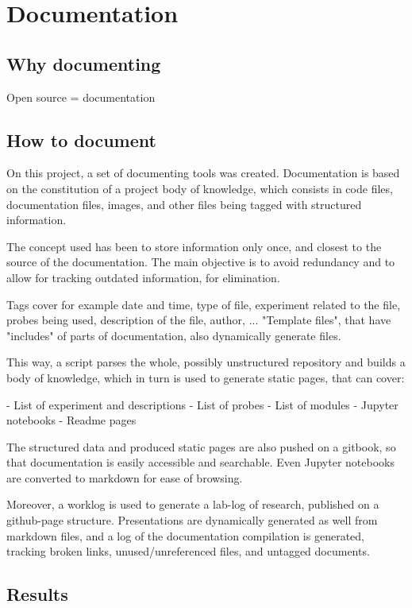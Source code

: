 \documentclass[conference]{IEEEtran}
\begin{document}
\section{Documentation}

\subsection{Why documenting}

Open source = documentation

\subsection{How to document}

On this project, a set of documenting tools was created. Documentation is based on the constitution of a project body of knowledge, which consists in code files, documentation files, images, and other files being tagged with structured information.

The concept used has been to store information only once, and closest to the source of the documentation. The main objective is to avoid redundancy and to allow for tracking outdated information, for elimination.

Tags cover for example date and time, type of file, experiment related to the file, probes being used, description of the file, author, ...  "Template files", that have "includes" of parts of documentation, also dynamically generate files.

This way, a script parses the whole, possibly unstructured repository and builds a body of knowledge, which in turn is used to generate static pages, that can cover:

- List of experiment and descriptions
- List of probes
- List of modules
- Jupyter notebooks
- Readme pages

The structured data and produced static pages are also pushed on a gitbook, so that documentation is easily accessible and searchable. Even Jupyter notebooks are converted to markdown for ease of browsing.

Moreover, a worklog is used to generate a lab-log of research, published on a github-page structure. Presentations are dynamically generated as well from markdown files, and a log of the documentation compilation is generated, tracking broken links, unused/unreferenced files, and untagged documents.



\subsection{Results}
 
\end{document}
